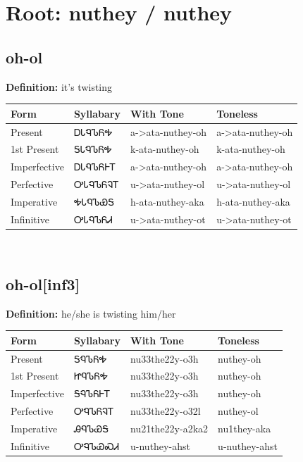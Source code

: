 \documentclass{article}%
\begin{document}
%
\normalsize%
\section*{Root: nuthey / nuthey}%
\subsection*{oh-ol}%
\textbf{Definition: }%
it’s twisting%
\\[0.5em]%
\begin{tabular}{|l|l|l|l|}%
\hline%
\textbf{Form}&\textbf{Syllabary}&\textbf{With Tone}&\textbf{Toneless}\\%
\hline%
Present&ᎠᏓᏄᏖᏲᎭ&a{-}>ata{-}nuthey{-}oh&a{-}>ata{-}nuthey{-}oh\\%
1st Present&ᎦᏓᏄᏖᏲᎭ&k{-}ata{-}nuthey{-}oh&k{-}ata{-}nuthey{-}oh\\%
Imperfective&ᎠᏓᏄᏖᏲᎰᎢ&a{-}>ata{-}nuthey{-}oh&a{-}>ata{-}nuthey{-}oh\\%
Perfective&ᎤᏓᏄᏖᏲᎸᎢ&u{-}>ata{-}nuthey{-}ol&u{-}>ata{-}nuthey{-}ol\\%
Imperative&ᎭᏓᏄᏖᏯᎦ&h{-}ata{-}nuthey{-}aka&h{-}ata{-}nuthey{-}aka\\%
Infinitive&ᎤᏓᏄᏖᏲᏗ&u{-}>ata{-}nuthey{-}ot&u{-}>ata{-}nuthey{-}ot\\%
\hline%
\end{tabular}%
\\[1em]%
\subsection*{oh-ol[inf3]}%
\textbf{Definition: }%
he/she is twisting him/her%
\\[0.5em]%
\begin{tabular}{|l|l|l|l|}%
\hline%
\textbf{Form}&\textbf{Syllabary}&\textbf{With Tone}&\textbf{Toneless}\\%
\hline%
Present&ᎦᏄᏖᏲᎭ&nu33the22y{-}o3h&nuthey{-}oh\\%
1st Present&ᏥᏄᏖᏲᎭ&nu33the22y{-}o3h&nuthey{-}oh\\%
Imperfective&ᎦᏄᏖᏲᎰᎢ&nu33the22y{-}o3h&nuthey{-}oh\\%
Perfective&ᎤᏄᏖᏲᎸᎢ&nu33the22y{-}o32l&nuthey{-}ol\\%
Imperative&ᎯᏄᏖᏯᎦ&nu21the22y{-}a2ka2&nu1they{-}aka\\%
Infinitive&ᎤᏄᏖᏯᏍᏗ&u{-}nuthey{-}ahst&u{-}nuthey{-}ahst\\%
\hline%
\end{tabular}%
\\[1em]%
\end{document}
